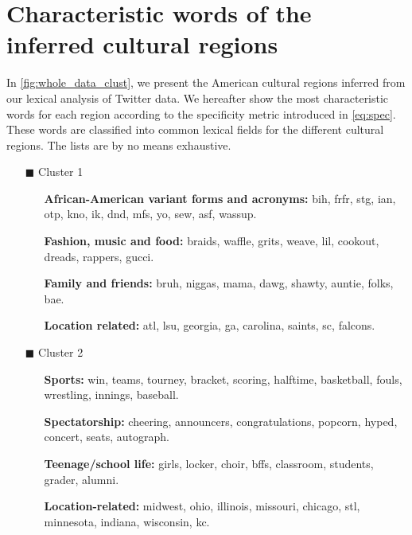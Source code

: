 \documentclass[../thesis.tex]{subfiles}
\begin{document}
\chapter{Characteristic words of the inferred cultural regions}
\label{ch:appendix_acr_words}

In \cref{fig:whole_data_clust}, we present the American cultural regions inferred from
our lexical analysis of Twitter data. We hereafter show the most characteristic words
for each region according to the specificity metric introduced in \cref{eq:spec}.
These words are classified into common lexical fields for the different cultural
regions. The lists are by no means exhaustive.

\begin{itemize}
  \item[\color{tol1}$\blacksquare$] Cluster 1
  \begin{itemize}
    \item[] \textbf{African-American variant forms and acronyms:} bih, frfr, stg, ian, otp, kno, ik, dnd, mfs, yo, sew, asf, wassup.
    \item[] \textbf{Fashion, music and food:} braids, waffle, grits, weave, lil, cookout, dreads, rappers, gucci.
    \item[] \textbf{Family and friends:} bruh, niggas, mama, dawg, shawty, auntie, folks, bae.
    \item[] \textbf{Location related:} atl, lsu, georgia, ga, carolina, saints, sc, falcons.
  \end{itemize}

  \item[\color{tol4}$\blacksquare$] Cluster 2
  \begin{itemize}
    \item[] \textbf{Sports:} win, teams, tourney, bracket, scoring, halftime, basketball, fouls, wrestling, innings, baseball.
    \item[] \textbf{Spectatorship:} cheering, announcers, congratulations, popcorn, hyped, concert, seats, autograph.
    \item[] \textbf{Teenage/school life:} girls, locker, choir, bffs, classroom, students, grader, alumni.
    \item[] \textbf{Location-related:} midwest, ohio, illinois, missouri, chicago, stl, minnesota, indiana, wisconsin, kc.
  \end{itemize}
  

\end{itemize}
\end{document}
